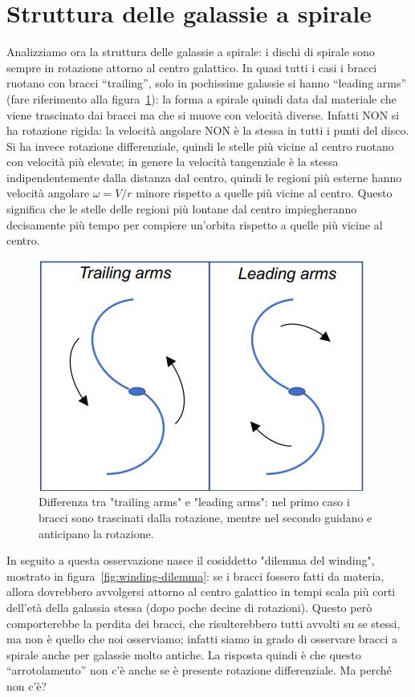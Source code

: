 \section{Struttura delle galassie a spirale}\label{sec:struttura-delle-galassie-a-spirale}
Analizziamo ora la struttura delle galassie a spirale: i dischi di spirale sono sempre in rotazione attorno al centro galattico. In quasi tutti i casi i bracci ruotano con bracci “trailing”, solo in pochissime galassie si hanno “leading arms” (fare riferimento alla figura~\ref{fig:trailing-leading arms}): la forma a spirale quindi data dal materiale che viene trascinato dai bracci ma che si muove con velocità diverse. Infatti NON si ha rotazione rigida: la velocità angolare NON è la stessa in tutti i punti del disco. Si ha invece rotazione differenziale, quindi le stelle più vicine al centro ruotano con velocità più elevate; in genere la velocità tangenziale è la stessa indipendentemente dalla distanza dal centro, quindi le regioni più esterne hanno velocità angolare $\omega = V/r$ minore rispetto a quelle più vicine al centro. Questo significa che le stelle delle regioni più lontane dal centro impiegheranno decisamente più tempo per compiere un'orbita rispetto a quelle più vicine al centro.

\begin{figure}
    \centering
    \includegraphics{immagini/trailing-leading-arms.png}
    \caption[width =0.5\textwidth]{Differenza tra "trailing arms" e "leading arms": nel primo caso i bracci sono trascinati dalla rotazione, mentre nel secondo guidano e anticipano la rotazione.}
    \label{fig:trailing-leading arms}
\end{figure}

In seguito a questa osservazione nasce il cosiddetto "dilemma del winding", mostrato in figura~\ref{fig:winding-dilemma}: se i bracci fossero fatti da materia, allora dovrebbero avvolgersi attorno al centro galattico in tempi scala più corti dell’età della galassia stessa (dopo poche decine di rotazioni). Questo però comporterebbe la perdita dei bracci, che risulterebbero tutti avvolti su se stessi, ma non è quello che noi osserviamo; infatti siamo in grado di osservare bracci a spirale anche per galassie molto antiche. La risposta quindi è che questo “arrotolamento” non c’è anche se è presente rotazione differenziale. Ma perché non c'è?

